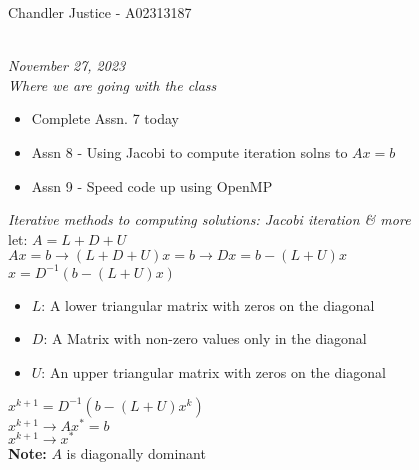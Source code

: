 \documentclass[10pt, AMS Euler]{article}
\begin{document}
\begin{flushright}
Chandler Justice - A02313187
\end{flushright}
\noindent \underline{\hspace{3in}}\\
\textit{November 27, 2023}\\
\textit{Where we are going with the class}\\
\begin{itemize}
  \item Complete Assn. 7 today
  \item Assn 8 - Using Jacobi to compute iteration solns to $Ax =b$
  \item Assn 9 - Speed code up using OpenMP
\end{itemize}

\textit{Iterative methods to computing solutions: Jacobi iteration \& more}\\
let: $A = L + D + U$\\
$Ax = b \rightarrow (L + D + U) x = b \rightarrow Dx = b - (L + U)x$\\
$x = D^{-1}(b- (L + U) x)$\\
\begin{itemize}
  \item $L$: A lower triangular matrix with zeros on the diagonal
  \item $D$: A Matrix with non-zero values only in the diagonal
  \item $U$: An upper triangular matrix with zeros on the diagonal
\end{itemize}
$x^{k+1} = D^{-1} (b - (L + U)x^k)$\\
$x^{k+1} \rightarrow Ax^* = b$\\
$x^{k+1} \rightarrow x^*$\\
\textbf{Note:} $A$ is diagonally dominant\\
\end{document}
